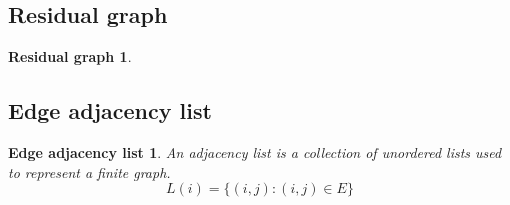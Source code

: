 \subsection{Residual graph}
\newtheorem*{rgraph}{Residual graph}
\begin{rgraph}

\end{rgraph}

\subsection{Edge adjacency list} %
\newtheorem*{ealist}{Edge adjacency list}
\begin{ealist}
An adjacency list is a collection of unordered lists used to represent a finite graph. $$L(i) = \{ (i, j) : (i, j) \in E \}$$
\end{ealist}